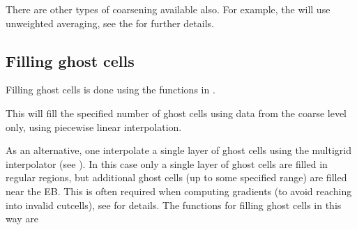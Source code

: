 \documentclass[letterpaper,10pt,english]{sphinxmanual}
\begin{document}
There are other types of coarsening available also.
For example, the  will use unweighted averaging, see the  for further details.


\subsection{Filling ghost cells}
\label{\detokenize{Source/MeshData:filling-ghost-cells}}\label{\detokenize{Source/MeshData:chap-ghostcells}}
Filling ghost cells is done using the  functions in {\hyperref[\detokenize{Source/AmrMesh:chap-amrmesh}]{}}.

\begin{sphinxVerbatim}[commandchars=\\\{\},formatcom=\scriptsize]
      

         
\end{sphinxVerbatim}

This will fill the specified number of ghost cells using data from the coarse level only, using piecewise linear interpolation.

As an alternative, one  interpolate a single layer of ghost cells using the multigrid interpolator (see {\hyperref[\detokenize{Source/LinearSolvers:chap-multigridinterpolation}]{}}).
In this case only a single layer of ghost cells are filled in regular regions, but additional ghost cells (up to some specified range) are filled near the EB.
This is often required when computing gradients (to avoid reaching into invalid cut\sphinxhyphen{}cells), see {\hyperref[\detokenize{Source/MeshData:chap-gradients}]{}} for details.
The functions for filling ghost cells in this way are
\end{document}
